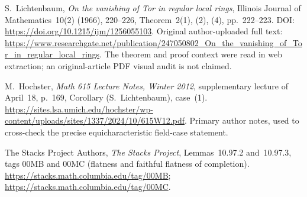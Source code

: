  S.~Lichtenbaum,
\emph{On the vanishing of Tor in regular local rings},
Illinois Journal of Mathematics~10(2) (1966), 220--226,
Theorem~2(1), (2), (4), pp.~222--223.
DOI: \url{https://doi.org/10.1215/ijm/1256055103}.
Original author-uploaded full text:
\url{https://www.researchgate.net/publication/247050802_On_the_vanishing_of_Tor_in_regular_local_rings}.
The theorem and proof context were read in web extraction;
an original-article PDF visual audit is not claimed.

 M.~Hochster,
\emph{Math 615 Lecture Notes, Winter 2012},
supplementary lecture of April~18, p.~169,
Corollary (S.~Lichtenbaum), case~(1).
\url{https://sites.lsa.umich.edu/hochster/wp-content/uploads/sites/1337/2024/10/615W12.pdf}.
Primary author notes, used to cross-check the precise
equicharacteristic field-case statement.

 The Stacks Project Authors,
\emph{The Stacks Project},
Lemmas~10.97.2 and~10.97.3, tags 00MB and 00MC
(flatness and faithful flatness of completion).
\url{https://stacks.math.columbia.edu/tag/00MB};
\url{https://stacks.math.columbia.edu/tag/00MC}.
